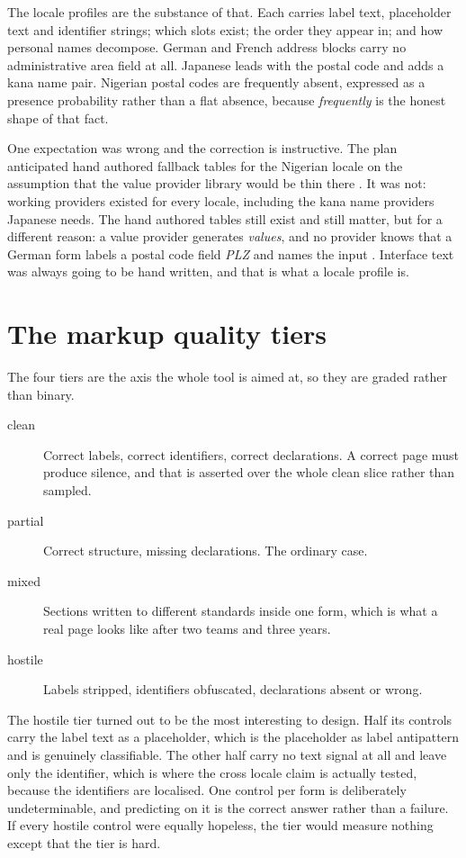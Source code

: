 The locale profiles are the substance of that. Each carries label text,
placeholder text and identifier strings; which slots exist; the order they
appear in; and how personal names decompose. German and French address blocks
carry no administrative area field at all. Japanese leads with the postal code
and adds a kana name pair. Nigerian postal codes are frequently absent,
expressed as a presence probability rather than a flat absence, because
\emph{frequently} is the honest shape of that fact.

One expectation was wrong and the correction is instructive. The plan
anticipated hand authored fallback tables for the Nigerian locale on the
assumption that the value provider library would be thin there
\cite{faker}. It was not: working providers existed for every locale, including
the kana name providers Japanese needs. The hand authored tables still exist and
still matter, but for a different reason: a value provider generates
\emph{values}, and no provider knows that a German form labels a postal code
field \emph{PLZ} and names the input . Interface text was always going
to be hand written, and that is what a locale profile is.

\section{The markup quality tiers}

The four tiers are the axis the whole tool is aimed at, so they are graded
rather than binary.

\begin{description}
  \item[clean] Correct labels, correct identifiers, correct declarations. A
    correct page must produce silence, and that is asserted over the whole clean
    slice rather than sampled.
  \item[partial] Correct structure, missing declarations. The ordinary case.
  \item[mixed] Sections written to different standards inside one form, which is
    what a real page looks like after two teams and three years.
  \item[hostile] Labels stripped, identifiers obfuscated, declarations absent or
    wrong.
\end{description}

The hostile tier turned out to be the most interesting to design. Half its
controls carry the label text as a placeholder, which is the placeholder as
label antipattern and is genuinely classifiable. The other half carry no text
signal at all and leave only the identifier, which is where the cross locale
claim is actually tested, because the identifiers are localised. One control per
form is deliberately undeterminable, and predicting  on it is the
correct answer rather than a failure. If every hostile control were equally
hopeless, the tier would measure nothing except that the tier is hard.

